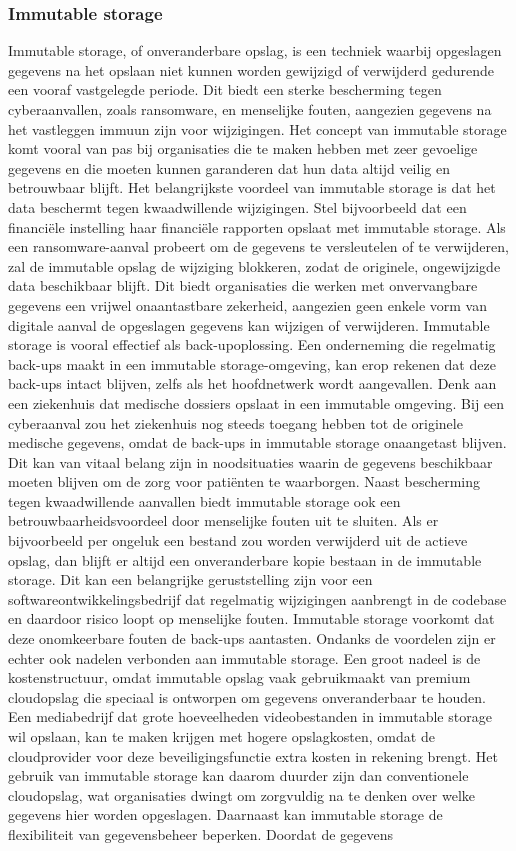 \subsubsection{Immutable storage}
Immutable storage, of onveranderbare opslag, is een techniek waarbij opgeslagen gegevens na het opslaan niet kunnen worden gewijzigd of verwijderd gedurende een vooraf vastgelegde periode. Dit biedt een sterke bescherming tegen cyberaanvallen, zoals ransomware, en menselijke fouten, aangezien gegevens na het vastleggen immuun zijn voor wijzigingen. Het concept van immutable storage komt vooral van pas bij organisaties die te maken hebben met zeer gevoelige gegevens en die moeten kunnen garanderen dat hun data altijd veilig en betrouwbaar blijft. Het belangrijkste voordeel van immutable storage is dat het data beschermt tegen kwaadwillende wijzigingen. Stel bijvoorbeeld dat een financiële instelling haar financiële rapporten opslaat met immutable storage. Als een ransomware-aanval probeert om de gegevens te versleutelen of te verwijderen, zal de immutable opslag de wijziging blokkeren, zodat de originele, ongewijzigde data beschikbaar blijft. Dit biedt organisaties die werken met onvervangbare gegevens een vrijwel onaantastbare zekerheid, aangezien geen enkele vorm van digitale aanval de opgeslagen gegevens kan wijzigen of verwijderen. Immutable storage is vooral effectief als back-upoplossing. Een onderneming die regelmatig back-ups maakt in een immutable storage-omgeving, kan erop rekenen dat deze back-ups intact blijven, zelfs als het hoofdnetwerk wordt aangevallen. Denk aan een ziekenhuis dat medische dossiers opslaat in een immutable omgeving. Bij een cyberaanval zou het ziekenhuis nog steeds toegang hebben tot de originele medische gegevens, omdat de back-ups in immutable storage onaangetast blijven. Dit kan van vitaal belang zijn in noodsituaties waarin de gegevens beschikbaar moeten blijven om de zorg voor patiënten te waarborgen. Naast bescherming tegen kwaadwillende aanvallen biedt immutable storage ook een betrouwbaarheidsvoordeel door menselijke fouten uit te sluiten. Als er bijvoorbeeld per ongeluk een bestand zou worden verwijderd uit de actieve opslag, dan blijft er altijd een onveranderbare kopie bestaan in de immutable storage. Dit kan een belangrijke geruststelling zijn voor een softwareontwikkelingsbedrijf dat regelmatig wijzigingen aanbrengt in de codebase en daardoor risico loopt op menselijke fouten. Immutable storage voorkomt dat deze onomkeerbare fouten de back-ups aantasten. Ondanks de voordelen zijn er echter ook nadelen verbonden aan immutable storage. Een groot nadeel is de kostenstructuur, omdat immutable opslag vaak gebruikmaakt van premium cloudopslag die speciaal is ontworpen om gegevens onveranderbaar te houden. Een mediabedrijf dat grote hoeveelheden videobestanden in immutable storage wil opslaan, kan te maken krijgen met hogere opslagkosten, omdat de cloudprovider voor deze beveiligingsfunctie extra kosten in rekening brengt. Het gebruik van immutable storage kan daarom duurder zijn dan conventionele cloudopslag, wat organisaties dwingt om zorgvuldig na te denken over welke gegevens hier worden opgeslagen. Daarnaast kan immutable storage de flexibiliteit van gegevensbeheer beperken. Doordat de gegevens 